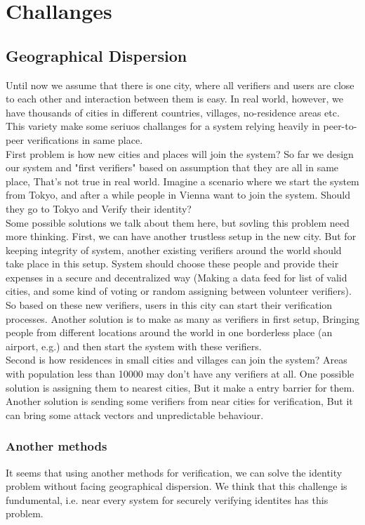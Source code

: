 \documentclass{article}
\begin{document}
\section{Challanges }


\subsection{Geographical Dispersion}
Until now we assume that there is one city, where all verifiers and users are close to each other and interaction between them is easy. In real world, however, we have thousands of cities in different countries, villages, no-residence areas etc. This variety make some seriuos challanges for a system relying heavily in peer-to-peer verifications in same place.
\\
First problem is how new cities and places will join the system? So far we design our system and "first verifiers" based on assumption that they are all in same place, That's not true in real world. Imagine a scenario where we start the system from Tokyo, and after a while people in Vienna want to join the system. Should they go to Tokyo and Verify their identity?
\\
Some possible solutions we talk about them here, but sovling this problem need more thinking. First, we can have another trustless setup in the new city. But for keeping integrity of system, another existing verifiers around the world should take place in this setup. System should choose these people and provide their expenses in a secure and decentralized way (Making a data feed for list of valid cities, and some kind of voting or random assigning between volunteer verifiers). So based on these new verifiers, users in this city can start their verification processes. Another solution is to make as many as verifiers in first setup, Bringing people from different locations around the world in one borderless place (an airport, e.g.) and then start the system with these verifiers. 
\\

Second is how residences in small cities and villages can join the system? Areas with population less than 10000  may don't have any verifiers at all. One possible solution is assigning them to nearest cities, But it make a entry barrier for them. Another solution is sending some verifiers from near cities for verification, But it can bring some attack vectors and unpredictable behaviour. 

\subsubsection*{Another methods}
It seems that using another methods for verification, we can solve the identity problem without facing geographical dispersion. We think that this challenge is fundumental, i.e. near every system for securely verifying identites  has this problem.
\\
\end{document}
